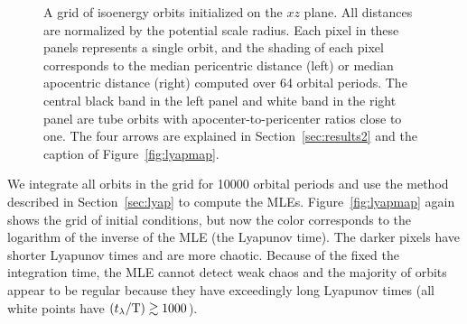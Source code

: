 \documentclass[letterpaper,12pt,preprint]{aastex}
\newcommand{\periods}{\ensuremath{{\rm T}}}
\begin{document}
\begin{figure}[h]%
\centering
\caption{ A grid of isoenergy orbits initialized on the $xz$ plane. All distances are normalized by the potential scale radius. Each pixel in these panels represents a single orbit, and the shading of each pixel corresponds to the median pericentric distance (left) or median apocentric distance (right) computed over 64 orbital periods. The central black band in the left panel and white band in the right panel are tube orbits with apocenter-to-pericenter ratios close to one. The four arrows are explained in Section~\ref{sec:results2} and the caption of Figure~\ref{fig:lyapmap}.}
\label{fig:apoper}
\end{figure}

We integrate all orbits in the grid for 10000 orbital periods and use the method described in Section~\ref{sec:lyap} to compute the MLEs. Figure~\ref{fig:lyapmap} again shows the grid of initial conditions, but now the color corresponds to the logarithm of the inverse of the MLE (the Lyapunov time). The darker pixels have shorter Lyapunov times and are more chaotic. Because of the fixed the integration time, the MLE cannot detect weak chaos and the majority of orbits appear to be regular because they have exceedingly long Lyapunov times (all white points have $(t_\lambda/\periods) \gtrsim 1000$).
\end{document}
